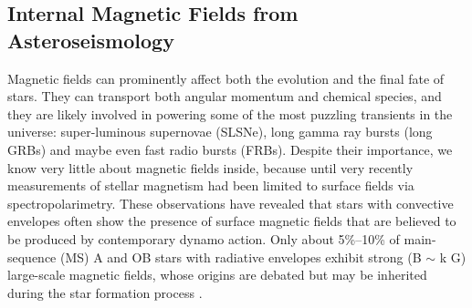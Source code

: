 \subsection{Internal Magnetic Fields from Asteroseismology}

Magnetic fields can prominently affect both the evolution and the final fate of stars. They can transport both angular momentum and chemical species, and they are likely involved in powering some of the most puzzling transients in the universe: super-luminous supernovae (SLSNe), long gamma ray bursts (long GRBs) and maybe even fast radio bursts (FRBs). Despite their importance, we know very little about magnetic fields inside, because until very recently measurements of stellar magnetism had been limited to surface fields via spectropolarimetry.
{\color{green} These observations have revealed that stars with convective envelopes often show the presence of surface magnetic fields that are believed to be produced by contemporary dynamo action. Only about 5\%–10\% of main-sequence (MS) A and OB stars with radiative envelopes exhibit strong (B $\sim$ k G) large-scale magnetic fields, whose origins are debated but may be inherited during the star formation process \citep[fossil fields, see e.g.,][]{2012ASPC..464..405W}.}